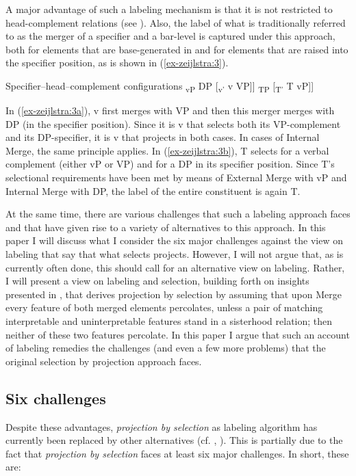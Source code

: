 \documentclass[output=paper
,modfonts
,nonflat]{langsci/langscibook}
\begin{document}
A major advantage of such a labeling mechanism is that it is not restricted to head-complement relations (see \citealt{Adger2003}). Also, the label of what is traditionally referred to as the merger of a specifier and a bar-level is captured under this approach, both for elements that are base-generated in and for elements that are raised into the specifier position, as is shown in (\ref{ex-zeijlstra:3}).

\begin{exe}
	\ex Specifier–head–complement configurations \label{ex-zeijlstra:3}
	\xlist
	\ex {[}\textsubscript{vP} DP {[}\textsubscript{v'} v VP{]}{]} \label{ex-zeijlstra:3a}
	\ex {[}\textsubscript{TP} {[}\textsubscript{T'} T vP{]}{]} \label{ex-zeijlstra:3b}
	\endxlist
\end{exe}
In (\ref{ex-zeijlstra:3a}), v first merges with VP and then this merger merges with DP (in the specifier position). Since it is v that selects both its VP-complement and its DP-specifier, it is v that projects in both cases. In cases of Internal Merge, the same principle applies. In (\ref{ex-zeijlstra:3b}), T selects for a verbal complement (either vP or VP) and for a DP in its specifier position. Since T’s selectional requirements have been met by means of External Merge with vP and Internal Merge with DP, the label of the entire constituent is again T.

At the same time, there are various challenges that such a labeling approach faces and that have given rise to a variety of alternatives to this approach. In this paper I will discuss what I consider the six major challenges against the view on labeling that say that what selects projects. However, I will not argue that, as is currently often done, this should call for an alternative view on labeling. Rather, I will present a view on labeling and selection, building forth on insights presented in \citet{Adger2003}, that derives projection by selection by assuming that upon Merge every feature of both merged elements percolates, unless a pair of matching interpretable and uninterpretable features stand in a sisterhood relation; then neither of these two features percolate. In this paper I argue that such an account of labeling remedies the challenges (and even a few more problems) that the original selection by projection approach faces.

\subsection{Six challenges} \label{sec-zeijlstra:1.2}
Despite these advantages, \textit{projection by selection} as labeling algorithm has currently been replaced by other alternatives (cf. \citealt{Collins2002}, \citealt{Chomsky2008, Chomsky2013, Chomsky2015}). This is partially due to the fact that \textit{projection by selection} faces at least six major challenges. In short, these are: 
\end{document}

